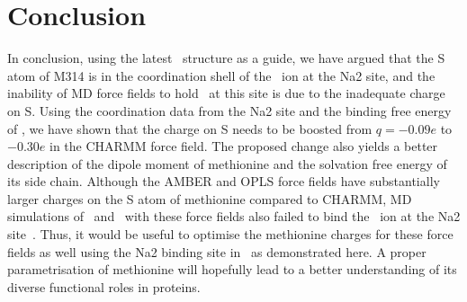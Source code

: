 \section{Conclusion}
In conclusion, using the latest \GltTk\ structure as a guide, we have argued that the S atom of 
M314 is in the coordination shell of the \Na\ ion at the Na2 site, and the inability of MD force 
fields to hold \Na\ at this site is due to the inadequate charge on S. Using the coordination data 
from the Na2 site and the binding free energy of \Na, we have shown that the charge on S needs to 
be boosted from $q = -0.09e$ to $-0.30e$ in the CHARMM force field. The proposed change also yields 
a better description of the dipole moment of methionine and the solvation free energy of its side 
chain. Although the AMBER and OPLS force fields have substantially larger charges on the S atom of 
methionine compared to CHARMM, MD simulations of \GltTk\ and \GltPh\ with these force fields also 
failed to bind the \Na\ ion at the Na2 site~\cite{Guskov2016,Venkatesan2015}. Thus, it would be 
useful to optimise the methionine charges for these force fields as well using the Na2 binding site 
in \GltTk\ as demonstrated here. A proper parametrisation of methionine will hopefully lead to a 
better understanding of its diverse functional roles in proteins.
